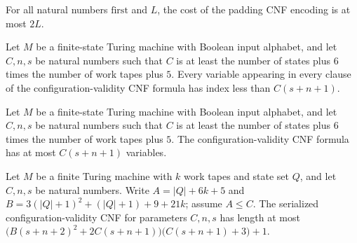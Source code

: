 \begin{theorem}
\label{Complexity.codecPadding_cost}
\leanok
{}
For all natural numbers $\mathrm{first}$ and $L$, the cost of the padding CNF encoding
is at most $2L$.
\end{theorem}

\begin{theorem}
\label{Complexity.configurationValidity_literals}
\leanok
{}
Let $M$ be a finite-state Turing machine with Boolean input alphabet, and let $C,n,s$ be
natural numbers such that $C$ is at least the number of states plus $6$ times the number
of work tapes plus $5$. Every variable appearing in every clause of the
configuration-validity CNF formula has index less than $C(s+n+1)$.
\end{theorem}

\begin{theorem}
\label{Complexity.configurationValidity_numVars}
\leanok
{}
Let $M$ be a finite-state Turing machine with Boolean input alphabet, and let $C,n,s$ be
natural numbers such that $C$ is at least the number of states plus $6$ times the number
of work tapes plus $5$. The configuration-validity CNF formula has at most $C(s+n+1)$
variables.
\end{theorem}

\begin{theorem}
\label{Complexity.configurationValidity_size_raw}
\leanok
{}
Let $M$ be a finite Turing machine with $k$ work tapes and state set $Q$, and let
$C,n,s$ be natural numbers. Write $A=|Q|+6k+5$ and $B=3(|Q|+1)^2+(|Q|+1)+9+21k$; assume
$A\le C$. The serialized configuration-validity CNF for parameters $C,n,s$ has length at
most $\bigl(B(s+n+2)^2+2C(s+n+1)\bigr)\bigl(C(s+n+1)+3\bigr)+1$.
\end{theorem}

